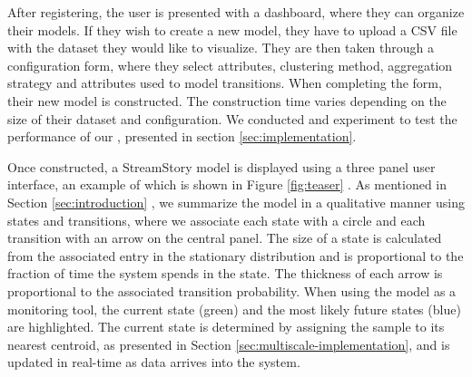 
\iffalse
Features  
\begin{itemize}
	\item Qualitative representation - states and transitions
	\item State identification services:
	\begin{itemize}
		\item State details and attribute highlighting - histograms + attribute colors
		\item \lstopar{Timeline + parallel coordinates \cite{parcoords} - when do states occur in time}
		\item \lstopar{Coloring states based on attributes}
		\item Decision trees + rule extraction - Explanation of states
		\item Automatic name generation
		\item Zooming into a state + showing paths from a state
	\end{itemize}
\end{itemize}
\fi

After registering, the user is presented with a dashboard, where they can organize their models.
If they wish to create a new model, they have to upload a CSV file with the dataset they would
like to visualize. They are then taken through a configuration form, where they select attributes,
clustering method, aggregation strategy and attributes used to model transitions. When completing
the form, their new model is constructed. The construction time varies depending on the size of 
their dataset and configuration. We conducted and experiment to test the performance of our ,
presented in section \ref{sec:implementation}.

Once constructed, a StreamStory model is displayed using a three panel user interface, an example of
which is shown in Figure \ref{fig:teaser} . As mentioned
in Section \ref{sec:introduction} , we summarize the model in a qualitative manner using states and 
transitions, where we associate each state with a circle and each transition with an arrow on the 
central panel. The size of a state is calculated from the associated entry in the stationary distribution
and is proportional to the fraction of time the system spends in the state. The thickness of each arrow
is proportional to the associated transition probability. When using the model as a
monitoring tool, the current state (green) and the most likely future states (blue)
are highlighted. The current state is determined by assigning the sample to its nearest 
centroid, as presented in Section \ref{sec:multiscale-implementation}, and is updated in real-time as
data arrives into the system.

